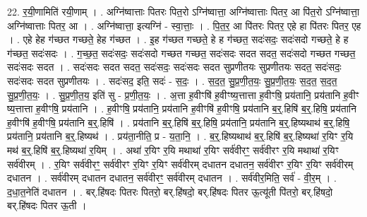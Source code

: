 \documentclass[17pt]{extarticle}
\begin{document}
22. र॒यी॒णामिति॑ रयी॒णाम् । . अग्नि॑ष्वात्ताः पितरः पित॒रो ऽग्नि॑ष्वात्ता॒ अग्नि॑ष्वात्ताः पितर॒ आ पि॑त॒रो ऽग्नि॑ष्वात्ता॒ अग्नि॑ष्वात्ताः पितर॒ आ । . अग्नि॑ष्वात्ता॒ इत्यग्नि॑ - स्वा॒त्ताः॒ । . पि॒त॒र॒ आ पि॑तरः पितर॒ एहे हा पि॑तरः पितर॒ एह । . एहे हेह ग॑च्छत गच्छते॒ हेह ग॑च्छत । . इ॒ह ग॑च्छत गच्छते॒ हे ह ग॑च्छत॒ सदः॑सदः॒ सदः॑सदो गच्छते॒ हे ह ग॑च्छत॒ सदः॑सदः । . ग॒च्छ॒त॒ सदः॑सदः॒ सदः॑सदो गच्छत गच्छत॒ सदः॑सदः सदत सदत॒ सदः॑सदो गच्छत गच्छत॒ सदः॑सदः सदत । . सदः॑सदः सदत सदत॒ सदः॑सदः॒ सदः॑सदः सदत सुप्रणीतयः सुप्रणीतयः सदत॒ सदः॑सदः॒ सदः॑सदः सदत सुप्रणीतयः । . सदः॑सद॒ इति॒ सदः॑ - स॒दः॒ । . स॒द॒त॒ सु॒प्र॒णी॒त॒यः॒ सु॒प्र॒णी॒त॒यः॒ स॒द॒त॒ स॒द॒त॒ सु॒प्र॒णी॒त॒यः॒ । . सु॒प्र॒णी॒त॒य॒ इति॑ सु - प्र॒णी॒त॒यः॒ । . अ॒त्ता ह॒वीꣳषि॑ ह॒वीꣳष्य॒त्तात्ता ह॒वीꣳषि॒ प्रय॑तानि॒ प्रय॑तानि ह॒वीꣳ ष्य॒त्तात्ता ह॒वीꣳषि॒ प्रय॑तानि । . ह॒वीꣳषि॒ प्रय॑तानि॒ प्रय॑तानि ह॒वीꣳषि॑ ह॒वीꣳषि॒ प्रय॑तानि ब॒र्॒.हिषि॑ ब॒र्॒.हिषि॒ प्रय॑तानि ह॒वीꣳषि॑ ह॒वीꣳषि॒ प्रय॑तानि ब॒र्॒.हिषि॑ । . प्रय॑तानि ब॒र्॒.हिषि॑ ब॒र्॒.हिषि॒ प्रय॑तानि॒ प्रय॑तानि ब॒र्॒.हिष्यथाथ॑ ब॒र्॒.हिषि॒ प्रय॑तानि॒ प्रय॑तानि ब॒र्॒.हिष्यथ॑ । . प्रय॑ता॒नीति॒ प्र - य॒ता॒नि॒ । . ब॒र्॒.हिष्यथाथ॑ ब॒र्॒.हिषि॑ ब॒र्॒.हिष्यथा॑ र॒यिꣳ र॒यि मथ॑ ब॒र्॒.हिषि॑ ब॒र्॒.हिष्यथा॑ र॒यिम् । . अथा॑ र॒यिꣳ र॒यि मथाथा॑ र॒यिꣳ सर्व॑वीरꣳ॒॒ सर्व॑वीरꣳ र॒यि मथाथा॑ र॒यिꣳ सर्व॑वीरम् । . र॒यिꣳ सर्व॑वीरꣳ॒॒ सर्व॑वीरꣳ र॒यिꣳ र॒यिꣳ सर्व॑वीरम् दधातन दधातन॒ सर्व॑वीरꣳ र॒यिꣳ र॒यिꣳ सर्व॑वीरम् दधातन । . सर्व॑वीरम् दधातन दधातन॒ सर्व॑वीरꣳ॒॒ सर्व॑वीरम् दधातन । . सर्व॑वीर॒मिति॒ सर्व॑ - वी॒र॒म् । . द॒धा॒त॒नेति॑ दधातन । . बर्.हि॑षदः पितरः पितरो॒ बर्.हि॑षदो॒ बर्.हि॑षदः पितर ऊ॒त्यू॑ती पि॑तरो॒ बर्.हि॑षदो॒ बर्.हि॑षदः पितर ऊ॒ती । \newline
\end{document}
